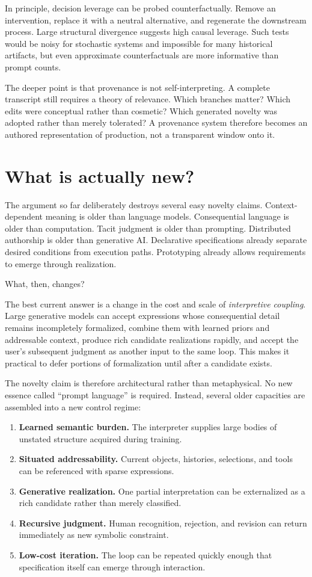 \documentclass[11pt]{article}
\begin{document}
In principle, decision leverage can be probed counterfactually. Remove an intervention, replace it with a neutral alternative, and regenerate the downstream process. Large structural divergence suggests high causal leverage. Such tests would be noisy for stochastic systems and impossible for many historical artifacts, but even approximate counterfactuals are more informative than prompt counts.

The deeper point is that provenance is not self-interpreting. A complete transcript still requires a theory of relevance. Which branches matter? Which edits were conceptual rather than cosmetic? Which generated novelty was adopted rather than merely tolerated? A provenance system therefore becomes an authored representation of production, not a transparent window onto it.

\section{What is actually new?}

The argument so far deliberately destroys several easy novelty claims. Context-dependent meaning is older than language models. Consequential language is older than computation. Tacit judgment is older than prompting. Distributed authorship is older than generative AI. Declarative specifications already separate desired conditions from execution paths. Prototyping already allows requirements to emerge through realization.

What, then, changes?

The best current answer is a change in the cost and scale of \emph{interpretive coupling}. Large generative models can accept expressions whose consequential detail remains incompletely formalized, combine them with learned priors and addressable context, produce rich candidate realizations rapidly, and accept the user's subsequent judgment as another input to the same loop. This makes it practical to defer portions of formalization until after a candidate exists.

The novelty claim is therefore architectural rather than metaphysical. No new essence called ``prompt language'' is required. Instead, several older capacities are assembled into a new control regime:

\begin{enumerate}[leftmargin=1.4em]
\item \textbf{Learned semantic burden.} The interpreter supplies large bodies of unstated structure acquired during training.
\item \textbf{Situated addressability.} Current objects, histories, selections, and tools can be referenced with sparse expressions.
\item \textbf{Generative realization.} One partial interpretation can be externalized as a rich candidate rather than merely classified.
\item \textbf{Recursive judgment.} Human recognition, rejection, and revision can return immediately as new symbolic constraint.
\item \textbf{Low-cost iteration.} The loop can be repeated quickly enough that specification itself can emerge through interaction.
\end{enumerate}
\end{document}
